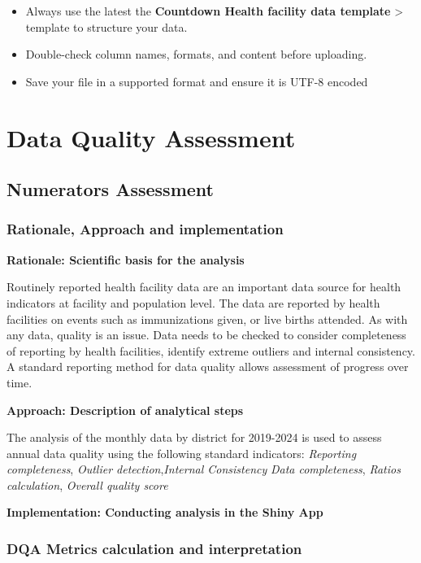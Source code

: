 \documentclass[
  english,
  letterpaper,
  DIV=11,
  numbers=noendperiod]{scrreprt}
\begin{document}
\begin{itemize}
\item
  Always use the latest the \textbf{Countdown Health facility data
  template} \textgreater{} template to structure your data.
\item
  Double-check column names, formats, and content before uploading.
\item
  Save your file in a supported format and ensure it is UTF-8 encoded
\end{itemize}

\part{Data Quality Assessment}

\chapter{Numerators Assessment}\label{numerators-assessment}

\section{Rationale, Approach and
implementation}\label{sec-dqa-assess-science}

\textbf{Rationale: Scientific basis for the analysis}

Routinely reported health facility data are an important data source for
health indicators at facility and population level. The data are
reported by health facilities on events such as immunizations given, or
live births attended. As with any data, quality is an issue. Data needs
to be checked to consider completeness of reporting by health
facilities, identify extreme outliers and internal consistency. A
standard reporting method for data quality allows assessment of progress
over time.

\textbf{Approach: Description of analytical steps}

The analysis of the monthly data by district for 2019-2024 is used to
assess annual data quality using the following standard indicators:
\emph{Reporting completeness}, \emph{Outlier detection},\emph{Internal
Consistency} \emph{Data completeness}, \emph{Ratios calculation},
\emph{Overall quality score}

\textbf{Implementation: Conducting analysis in the Shiny App}

\section{DQA Metrics calculation and
interpretation}\label{dqa-metrics-calculation-and-interpretation}
\end{document}
